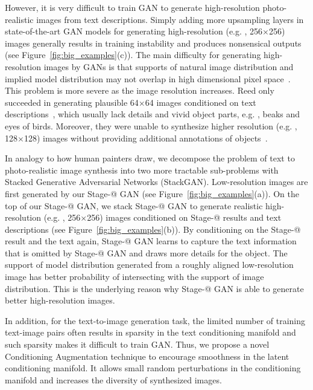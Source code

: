 However, it is very difficult to train GAN to generate high-resolution photo-realistic images from text descriptions. Simply adding more upsampling layers in state-of-the-art GAN models for generating high-resolution (e.g. , 256$\times$256) images generally results in training instability and produces nonsensical outputs (see Figure~\ref{fig:big_examples}(c)). The main difficulty for generating high-resolution images by GANs is that supports of natural image distribution and implied model distribution may not overlap in high dimensional pixel space~\cite{Casper2016, ArjovskyB17}. This problem is more severe as the image resolution increases. Reed \etal only succeeded in generating plausible 64$\times$64 images conditioned on text descriptions~\cite{reed2016generative}, which usually lack details and vivid object parts, e.g. , beaks and eyes of birds. Moreover, they were unable to synthesize higher resolution (e.g. , 128$\times$128) images without providing additional annotations of objects~\cite{reed2016learning}.

In analogy to how human painters draw, we decompose the problem of text to photo-realistic image synthesis into two more tractable sub-problems with Stacked Generative Adversarial Networks (StackGAN). Low-resolution images are first generated by our Stage-\expandafter\@slowromancap{}@ GAN (see Figure~\ref{fig:big_examples}(a)). On the top of our Stage-\expandafter\@slowromancap{}@ GAN, we stack Stage-\expandafter\@slowromancap{}@ GAN to generate realistic high-resolution (e.g. , 256$\times$256) images conditioned on Stage-\expandafter\@slowromancap{}@ results and text descriptions (see Figure~\ref{fig:big_examples}(b)). By conditioning on the Stage-\expandafter\@slowromancap{}@ result and the text again, Stage-\expandafter\@slowromancap{}@ GAN learns to capture the text information that is omitted by Stage-\expandafter\@slowromancap{}@ GAN and draws more details for the object. The support of model distribution generated from a roughly aligned low-resolution image has better probability of intersecting with the support of image distribution. This is the underlying reason why Stage-\expandafter\@slowromancap{}@ GAN is able to generate better high-resolution images.

In addition, for the text-to-image generation task, the limited number of training text-image pairs often results in sparsity in the text conditioning manifold and such sparsity makes it difficult to train GAN. Thus, we propose a novel Conditioning Augmentation technique to encourage smoothness in the latent conditioning manifold. It allows small random perturbations in the conditioning manifold and increases the diversity of synthesized images. 

